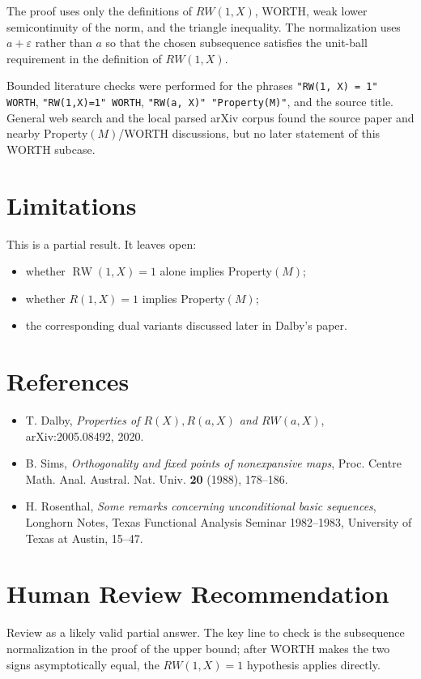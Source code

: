 \documentclass[11pt]{article}
\DeclareMathOperator{\RW}{RW}
\begin{document}
The proof uses only the definitions of $RW(1,X)$, WORTH, weak lower
semicontinuity of the norm, and the triangle inequality.  The normalization
uses $a+\varepsilon$ rather than $a$ so that the chosen subsequence satisfies
the unit-ball requirement in the definition of $RW(1,X)$.

Bounded literature checks were performed for the phrases
\texttt{"RW(1, X) = 1" WORTH},
\texttt{"RW(1,X)=1" WORTH},
\texttt{"RW(a, X)" "Property(M)"}, and the source title.  General web search
and the local parsed arXiv corpus found the source paper and nearby
Property$(M)$/WORTH discussions, but no later statement of this WORTH subcase.

\section*{Limitations}

This is a partial result.  It leaves open:
\begin{itemize}
\item whether $\RW(1,X)=1$ alone implies Property$(M)$;
\item whether $R(1,X)=1$ implies Property$(M)$;
\item the corresponding dual variants discussed later in Dalby's paper.
\end{itemize}

\section*{References}

\begin{itemize}
\item T. Dalby, \emph{Properties of $R(X), R(a,X)$ and $RW(a,X)$},
arXiv:2005.08492, 2020.
\item B. Sims, \emph{Orthogonality and fixed points of nonexpansive maps},
Proc. Centre Math. Anal. Austral. Nat. Univ. \textbf{20} (1988), 178--186.
\item H. Rosenthal, \emph{Some remarks concerning unconditional basic
sequences}, Longhorn Notes, Texas Functional Analysis Seminar 1982--1983,
University of Texas at Austin, 15--47.
\end{itemize}

\section*{Human Review Recommendation}

Review as a likely valid partial answer.  The key line to check is the
subsequence normalization in the proof of the upper bound; after WORTH makes
the two signs asymptotically equal, the $RW(1,X)=1$ hypothesis applies
directly.
\end{document}
